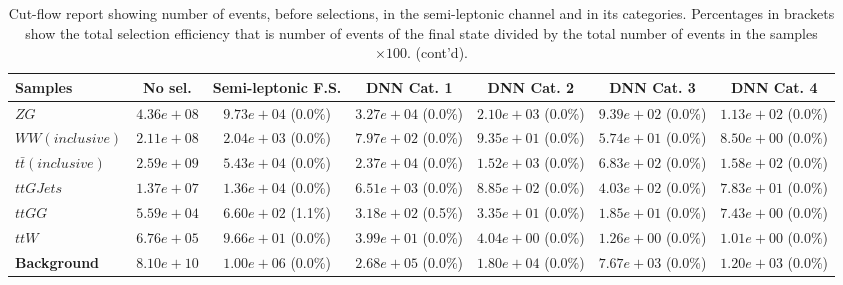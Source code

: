 \begin{landscape}
\begin{table}[]
    \caption{Cut-flow report showing number of events, before selections, in the semi-leptonic channel and in its categories. Percentages in brackets show the total selection efficiency that is number of events of the final state divided by the total number of events in the samples $\times 100$. (cont'd).}\begin{tabular}{ |l|c|c|c|c|c|c| }
    \hline
    Samples & No sel.                   & Semi-leptonic F.S. & DNN Cat. 1 & DNN Cat. 2 & DNN Cat. 3 & DNN Cat. 4 \\
      \hline

                                      $ZG$ &  $4.36e+08$ &   $9.73e+04$ (0.0\%) &  $3.27e+04$ (0.0\%) &  $2.10e+03$ (0.0\%) &    $9.39e+02$ (0.0\%) &    $1.13e+02$ (0.0\%) \\
                           $WW(inclusive)$ &  $2.11e+08$ &   $2.04e+03$ (0.0\%) &  $7.97e+02$ (0.0\%) &  $9.35e+01$ (0.0\%) &    $5.74e+01$ (0.0\%) &    $8.50e+00$ (0.0\%) \\
                    $t\bar{t} (inclusive)$ &  $2.59e+09$ &   $5.43e+04$ (0.0\%) &  $2.37e+04$ (0.0\%) &  $1.52e+03$ (0.0\%) &    $6.83e+02$ (0.0\%) &    $1.58e+02$ (0.0\%) \\
                                 $ttGJets$ &  $1.37e+07$ &   $1.36e+04$ (0.0\%) &  $6.51e+03$ (0.0\%) &  $8.85e+02$ (0.0\%) &    $4.03e+02$ (0.0\%) &    $7.83e+01$ (0.0\%) \\
                                    $ttGG$ &  $5.59e+04$ &   $6.60e+02$ (1.1\%) &  $3.18e+02$ (0.5\%) &  $3.35e+01$ (0.0\%) &    $1.85e+01$ (0.0\%) &    $7.43e+00$ (0.0\%) \\
                                     $ttW$ &  $6.76e+05$ &   $9.66e+01$ (0.0\%) &  $3.99e+01$ (0.0\%) &  $4.04e+00$ (0.0\%) &    $1.26e+00$ (0.0\%) &    $1.01e+00$ (0.0\%) \\
                       \textbf{Background} &  $8.10e+10$ &   $1.00e+06$ (0.0\%) &  $2.68e+05$ (0.0\%) &  $1.80e+04$ (0.0\%) &    $7.67e+03$ (0.0\%) &    $1.20e+03$ (0.0\%) \\
      \hline
    \end{tabular}
\end{table}
\end{landscape}


